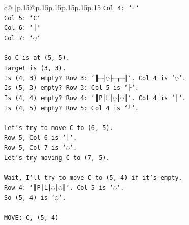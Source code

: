 \documentclass{article}
\begin{document}
{\begin{supertabular}{c@{$\;$}|p{.15\linewidth}@{}p{.15\linewidth}p{.15\linewidth}p{.15\linewidth}p{.15\linewidth}p{.15\linewidth}}
{{{\texttt{Col 4: `┘`} \\
\texttt{Col 5: `C`} \\
\texttt{Col 6: `│`} \\
\texttt{Col 7: `◌`} \\
\\ 
\texttt{So C is at (5, 5).} \\
\texttt{Target is (3, 3).} \\
\texttt{Is (4, 3) empty? Row 3: `╟─┤◌├─┬─╢`. Col 4 is `◌`.} \\
\texttt{Is (5, 3) empty? Row 3: Col 5 is `├`.} \\
\texttt{Is (4, 4) empty? Row 4: `║P│L│◌│◌║`. Col 4 is `│`.} \\
\texttt{Is (4, 5) empty? Row 5: Col 4 is `┘`.} \\
\\ 
\texttt{Let's try to move C to (6, 5).} \\
\texttt{Row 5, Col 6 is `│`.} \\
\texttt{Row 5, Col 7 is `◌`.} \\
\texttt{Let's try moving C to (7, 5).} \\
\\ 
\texttt{Wait, I'll try to move C to (5, 4) if it's empty.} \\
\texttt{Row 4: `║P│L│◌│◌║`. Col 5 is `◌`.} \\
\texttt{So (5, 4) is `◌`.} \\
\\ 
\texttt{MOVE: C, (5, 4)} \\
            }
        }
    }
     \\ \\


\end{supertabular}}
\end{document}
